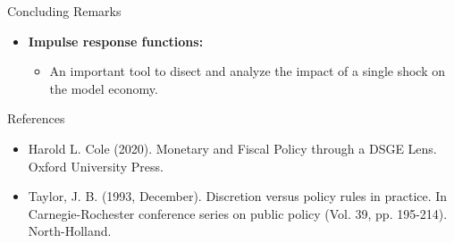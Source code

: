 \documentclass[10pt,c,aspectratio=1610,handout]{beamer}
\begin{document}
\begin{frame}{Concluding Remarks}
\begin{itemize}
    \begin{itemize}%
      \item[$\rightarrow$] Surprise money growth can lead to an increase in aggregate demand.%
      \item[$\rightarrow$] Surprise money injections must come after prices are set and before households buy goods.%
    \end{itemize}%
    \pause%
    \item[$\blacktriangleright$] \textbf{Impulse response functions:}%
    \begin{itemize}%
      \item[$\rightarrow$] An important tool to disect and analyze the impact of a single shock on the model economy.%
    \end{itemize}%
  \end{itemize}%
\end{frame}%
\begin{frame}{References}%
  \begin{itemize}%
    \item[$\blacktriangleright$] Harold L. Cole (2020). Monetary and Fiscal Policy through a DSGE Lens. Oxford University Press.%
    \item[$\blacktriangleright$] Taylor, J. B. (1993, December). Discretion versus policy rules in practice. In Carnegie-Rochester conference series on public policy (Vol. 39, pp. 195-214). North-Holland.%
  \end{itemize}%
\end{frame}%
\end{document}
